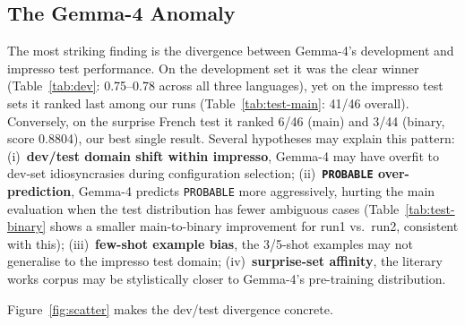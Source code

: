 \documentclass[
]{ceurart}
\theoremstyle{definition}
\begin{document}
\subsection{The Gemma-4 Anomaly}

The most striking finding is the divergence between Gemma-4's development and impresso test performance.
On the development set it was the clear winner (Table~\ref{tab:dev}: 0.75--0.78 across all three languages), yet on the impresso test sets it ranked last among our runs (Table~\ref{tab:test-main}: 41/46 overall).
Conversely, on the surprise French test it ranked 6/46 (main) and 3/44 (binary, score 0.8804), our best single result.
Several hypotheses may explain this pattern: (i)~\textbf{dev/test domain shift within impresso}, Gemma-4 may have overfit to dev-set idiosyncrasies during configuration selection; (ii)~\textbf{\texttt{PROBABLE} over-prediction}, Gemma-4 predicts \texttt{PROBABLE} more aggressively, hurting the main evaluation when the test distribution has fewer ambiguous cases (Table~\ref{tab:test-binary} shows a smaller main-to-binary improvement for run1 vs.\ run2, consistent with this); (iii)~\textbf{few-shot example bias}, the 3/5-shot examples may not generalise to the impresso test domain; (iv)~\textbf{surprise-set affinity}, the literary works corpus may be stylistically closer to Gemma-4's pre-training distribution.

Figure~\ref{fig:scatter} makes the dev/test divergence concrete.
\end{document}
